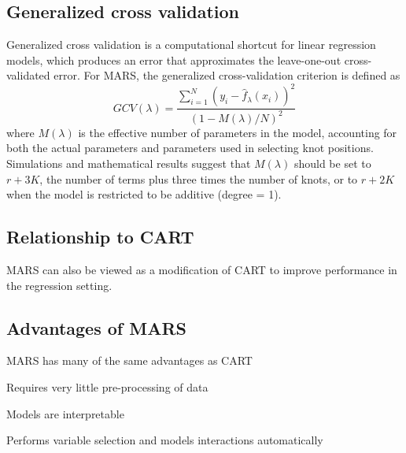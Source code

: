 \documentclass[12pt]{article}
\begin{document}

\subsection{Generalized cross validation} %
\label{sub:generalized_cross_validation}

Generalized cross validation is a computational shortcut for linear regression models, which produces an error that approximates the leave-one-out cross-validated error. For MARS, the generalized cross-validation criterion is defined as
\begin{equation}
  GCV(\lambda) = 
    \frac{
      \sum_{i = 1}^{N}(y_{i} - \hat{f}_{\lambda}(x_{i}))^2
    }{
      (1 - M(\lambda)/N)^2
    }
\end{equation}
where $M(\lambda)$ is the effective number of parameters in the model, accounting for both the actual parameters and parameters used in selecting knot positions. Simulations and mathematical results suggest that $M(\lambda)$ should be set to $r + 3K$, the number of terms plus three times the number of knots, or to $r + 2K$ when the model is restricted to be additive (degree = 1).


\subsection{Relationship to CART} %
\label{sub:relationship_to_cart}

MARS can also be viewed as a modification of CART to improve performance in the regression setting.


\subsection{Advantages of MARS} %
\label{sub:advantages_of_mars}

MARS has many of the same advantages as CART

Requires very little pre-processing of data

Models are interpretable

Performs variable selection and models interactions automatically

\end{document}
